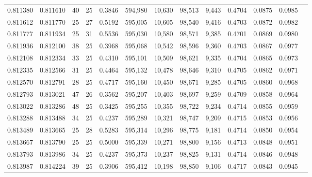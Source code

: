 \begin{tabular}{rrrrrrrrrrrrr}
0.811380 & 0.811610 &    40 &  25 &                                     0.3846 & 594,980 &  10,630 &  98,513 &   9,443 & 0.4704 & 0.0875 & 0.0985 \\
0.811612 & 0.811770 &    25 &  27 &                                     0.5192 & 595,005 &  10,605 &  98,540 &   9,416 & 0.4703 & 0.0872 & 0.0982 \\
0.811777 & 0.811934 &    25 &  31 &                                     0.5536 & 595,030 &  10,580 &  98,571 &   9,385 & 0.4701 & 0.0869 & 0.0980 \\
0.811936 & 0.812100 &    38 &  25 &                                     0.3968 & 595,068 &  10,542 &  98,596 &   9,360 & 0.4703 & 0.0867 & 0.0977 \\
0.812108 & 0.812334 &    33 &  25 &                                     0.4310 & 595,101 &  10,509 &  98,621 &   9,335 & 0.4704 & 0.0865 & 0.0973 \\
0.812335 & 0.812566 &    31 &  25 &                                     0.4464 & 595,132 &  10,478 &  98,646 &   9,310 & 0.4705 & 0.0862 & 0.0971 \\
0.812570 & 0.812791 &    28 &  25 &                                     0.4717 & 595,160 &  10,450 &  98,671 &   9,285 & 0.4705 & 0.0860 & 0.0968 \\
0.812793 & 0.813021 &    47 &  26 &                                     0.3562 & 595,207 &  10,403 &  98,697 &   9,259 & 0.4709 & 0.0858 & 0.0964 \\
0.813022 & 0.813286 &    48 &  25 &                                     0.3425 & 595,255 &  10,355 &  98,722 &   9,234 & 0.4714 & 0.0855 & 0.0959 \\
0.813288 & 0.813488 &    34 &  25 &                                     0.4237 & 595,289 &  10,321 &  98,747 &   9,209 & 0.4715 & 0.0853 & 0.0956 \\
0.813489 & 0.813665 &    25 &  28 &                                     0.5283 & 595,314 &  10,296 &  98,775 &   9,181 & 0.4714 & 0.0850 & 0.0954 \\
0.813667 & 0.813790 &    25 &  25 &                                     0.5000 & 595,339 &  10,271 &  98,800 &   9,156 & 0.4713 & 0.0848 & 0.0951 \\
0.813793 & 0.813986 &    34 &  25 &                                     0.4237 & 595,373 &  10,237 &  98,825 &   9,131 & 0.4714 & 0.0846 & 0.0948 \\
0.813987 & 0.814224 &    39 &  25 &                                     0.3906 & 595,412 &  10,198 &  98,850 &   9,106 & 0.4717 & 0.0843 & 0.0945 \\

\end{tabular}
